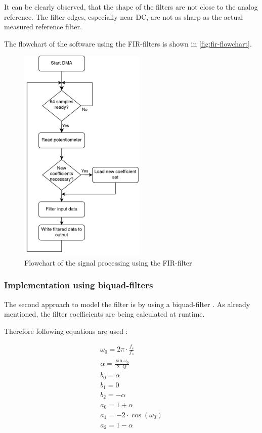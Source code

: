 
It can be clearly observed, that the shape of the filters are not close to the analog reference.
The filter edges, especially near DC, are not as sharp as the actual measured reference filter.

The flowchart of the software using the \ac{FIR}-filters is shown in \autoref{fig:fir-flowchart}.

\begin{figure}[!h]
    \centering
    \includegraphics[width=6cm]{img/FIR_flowchart.png}
    \caption{Flowchart of the signal processing using the \ac{FIR}-filter}
    \label{fig:fir-flowchart}
\end{figure}

\cleardoublepage

\subsubsection{Implementation using biquad-filters}

The second approach to model the filter is by using a biquad-filter \cite{arm_dsp}.
As already mentioned, the filter coefficients are being calculated at runtime.

Therefore following equations are used \cite{cookbook_audio}:

\begin{align}
    \omega_0 = 2 \pi \cdot \frac{f_c}{f_s}\\
    \alpha = \frac{\sin{\omega_0}}{2 \cdot Q}\\
    b_0 = \alpha\\
    b_1 = 0\\
    b_2 = -\alpha\\
    a_0 = 1 + \alpha\\
    a_1 = -2 \cdot \cos(\omega_0)\\
    a_2 = 1 - \alpha
\end{align}

